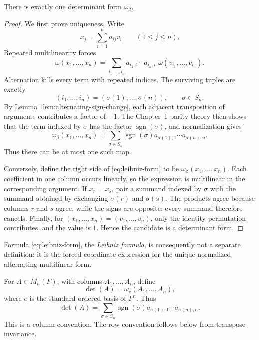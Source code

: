 \begin{theorem}\label{thm:det-form}
There is exactly one determinant form \(\omega_\beta\).
\end{theorem}
\begin{proof}
We first prove uniqueness. Write
\[
x_j=\sum_{i=1}^n a_{ij}v_i\qquad(1\leq j\leq n).
\]
Repeated multilinearity forces
\[
\omega(x_1,\ldots,x_n)
=\sum_{i_1,\ldots,i_n}
a_{i_1,1}\cdots a_{i_n,n}\,
\omega(v_{i_1},\ldots,v_{i_n}).
\]
Alternation kills every term with repeated indices. The surviving tuples are
exactly
\[
(i_1,\ldots,i_n)=(\sigma(1),\ldots,\sigma(n)),
\qquad \sigma\in S_n.
\]
By Lemma~\ref{lem:alternating-sign-change}, each adjacent transposition of
arguments contributes a factor of \(-1\). The Chapter~1 parity theory then
shows that the term indexed by \(\sigma\) has the factor
\(\operatorname{sgn}(\sigma)\), and normalization gives
\begin{equation}\label{eq:leibniz-form}
\omega_\beta(x_1,\ldots,x_n)
=\sum_{\sigma\in S_n}\operatorname{sgn}(\sigma)
a_{\sigma(1),1}\cdots a_{\sigma(n),n}.
\end{equation}
Thus there can be at most one such map.

Conversely, define the right side of \eqref{eq:leibniz-form} to be
\(\omega_\beta(x_1,\ldots,x_n)\). Each coefficient in one column occurs
linearly, so the expression is multilinear in the corresponding argument.
If \(x_r=x_s\), pair a summand indexed by \(\sigma\) with the summand obtained
by exchanging \(\sigma(r)\) and \(\sigma(s)\). The products agree because
columns \(r\) and \(s\) agree, while the signs are opposite; every summand
therefore cancels. Finally, for \((x_1,\ldots,x_n)=(v_1,\ldots,v_n)\), only
the identity permutation contributes, and the value is \(1\). Hence the
candidate is a determinant form.
\end{proof}

Formula \eqref{eq:leibniz-form}, the \emph{Leibniz formula}, is consequently
not a separate definition: it is the forced coordinate expression for the
unique normalized alternating multilinear form.

\begin{definition}
For \(A\in M_n(F)\), with columns \(A_1,\ldots,A_n\), define
\[
\det(A)=\omega_e(A_1,\ldots,A_n),
\]
where \(e\) is the standard ordered basis of \(F^n\). Thus
\[
\det(A)=
\sum_{\sigma\in S_n}\operatorname{sgn}(\sigma)
a_{\sigma(1),1}\cdots a_{\sigma(n),n}.
\]
This is a column convention. The row convention follows below from transpose
invariance.
\end{definition}

